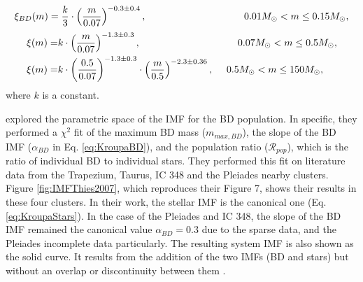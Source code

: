 \begin{equation}
\label{eq:KroupaBD}
\xi_{BD}(m)=\frac{k}{3}\cdot\left(\frac{m}{0.07}\right)^{-0.3\pm0.4}, \hspace{3.5cm} 0.01M_{\odot} < m \leq 0.15 M_{\odot},
\end{equation}
\begin{align}
\label{eq:KroupaStars}
\xi(m)=& k\cdot \left(\frac{m}{0.07}\right)^{-1.3\pm0.3}, \hspace{3.5cm} 0.07M_{\odot} < m \leq 0.5 M_{\odot},\nonumber\\
\xi(m)=& k\cdot \left(\frac{0.5}{0.07}\right)^{-1.3\pm0.3}\cdot  \left(\frac{m}{0.5}\right)^{-2.3\pm0.36}, \ \ \ \ 0.5 M_{\odot} < m \leq 150 M_{\odot},
\end{align}
where $k$ is a constant.
 
 \citet{Thies2007} explored the parametric space of the  IMF for the BD population. In specific, they performed a $\chi^2$ fit of the maximum BD mass ($m_{max,BD}$), the slope of the BD IMF ($\alpha_{BD}$ in Eq. \ref{eq:KroupaBD}), and the population ratio ($\mathcal{R}_{pop}$), which is the ratio of individual BD to individual stars. They performed this fit on literature data from the Trapezium, Taurus, IC 348 and the Pleiades nearby clusters. Figure \ref{fig:IMFThies2007}, which reproduces their Figure 7, shows their results in these four clusters. In their work, the stellar IMF is the canonical one (Eq. \ref{eq:KroupaStars}). In the case of the Pleiades and IC 348, the slope of the BD IMF remained the canonical value $\alpha_{BD}=0.3$ due to the sparse data, and the Pleiades  incomplete data particularly. The resulting system IMF is also shown as the solid curve. It results from the addition of the two IMFs (BD and stars) but without an overlap or discontinuity between them \cite[see][for details]{Thies2007}.
 
